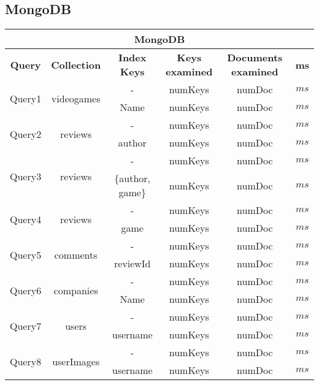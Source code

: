 \subsection{MongoDB}
	\begin{center}
		\begin{tabular}{ |c|c|c|c|c|c| } 
			\hline
			\multicolumn{6}{|c|}{\textbf{MongoDB}}\\
			\hline
			\textbf{Query} & \textbf{Collection} &\textbf{Index Keys} & \textbf{Keys examined} & \textbf{Documents examined} &\textbf{ms} \\ 
			\hline
			\multirow{2}{*}{Query1} & \multirow{2}{*}{videogames} & - & numKeys & numDoc & $ms$ \\ &&Name & numKeys & numDoc & $ms$  \\ 
			\hline
			\multirow{2}{*}{Query2} & \multirow{2}{*}{reviews} & - & numKeys & numDoc & $ms$ \\ && author & numKeys & numDoc & $ms$  \\ 
			\hline
			\multirow{2}{*}{Query3} & \multirow{2}{*}{reviews} & - & numKeys & numDoc & $ms$ \\ && \{author, game\} & numKeys & numDoc & $ms$  \\ 
			\hline
			\multirow{2}{*}{Query4} & \multirow{2}{*}{reviews} & - & numKeys & numDoc & $ms$ \\ && game & numKeys & numDoc & $ms$  \\ 
			\hline
			\multirow{2}{*}{Query5} & \multirow{2}{*}{comments} & - & numKeys & numDoc & $ms$ \\ && reviewId & numKeys & numDoc & $ms$  \\ 
			\hline
			\multirow{2}{*}{Query6} & \multirow{2}{*}{companies} & - & numKeys & numDoc & $ms$ \\ && Name & numKeys & numDoc & $ms$  \\
			\hline 
			\multirow{2}{*}{Query7} & \multirow{2}{*}{users} & - & numKeys & numDoc & $ms$ \\ && username & numKeys & numDoc & $ms$  \\
			\hline
			\multirow{2}{*}{Query8} & \multirow{2}{*}{userImages} & - & numKeys & numDoc & $ms$ \\ && username & numKeys & numDoc & $ms$  \\  
			\hline
		\end{tabular}
	\end{center}


